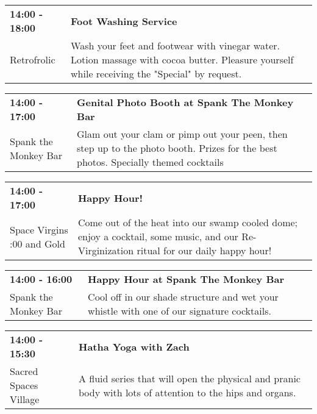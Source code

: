 \begin{tabular}{ p{1in} p{2.2in} }
    \textbf{14:00 - 18:00} & \textbf{Foot Washing Service} \\
    Retrofrolic \newline  & Wash your feet and footwear with vinegar water.  Lotion massage with cocoa butter. Pleasure yourself while receiving the "Special" by request. \\
    \hline 
\end{tabular}
    
\begin{tabular}{ p{1in} p{2.2in} }
    \textbf{14:00 - 17:00} & \textbf{Genital Photo Booth at Spank The Monkey Bar} \\
    Spank the Monkey Bar \newline  & Glam out your clam or pimp out your peen, then step up to the photo booth. Prizes for the best photos. Specially themed cocktails \\
    \hline 
\end{tabular}
    
\begin{tabular}{ p{1in} p{2.2in} }
    \textbf{14:00 - 17:00} & \textbf{Happy Hour!} \\
    Space Virgins \newline 6:00 and Gold & Come out of the heat into our swamp cooled dome; enjoy a cocktail, some music, and our Re-Virginization ritual for our daily happy hour! \\
    \hline 
\end{tabular}
    
\begin{tabular}{ p{1in} p{2.2in} }
    \textbf{14:00 - 16:00} & \textbf{Happy Hour at Spank The Monkey Bar} \\
    Spank the Monkey Bar \newline  & Cool off in our shade structure and wet your whistle with one of our signature cocktails. \\
    \hline 
\end{tabular}
    
\begin{tabular}{ p{1in} p{2.2in} }
    \textbf{14:00 - 15:30} & \textbf{Hatha Yoga with Zach} \\
    Sacred Spaces Village \newline  & A fluid series that will open the physical and pranic body with lots of attention to the hips and organs. \\
    \hline 
\end{tabular}
    
